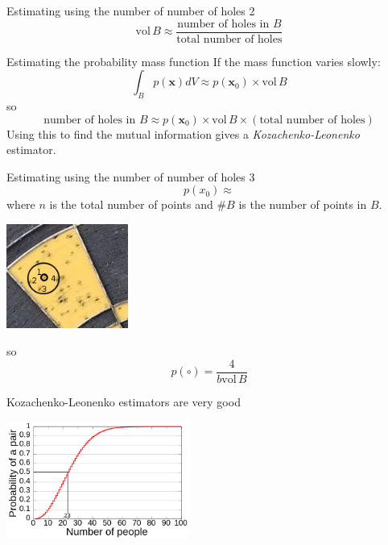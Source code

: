 \documentclass{beamer}
\begin{document}
\begin{frame}{Estimating using the number of number of holes 2}
\color{dark}
$$\mbox{vol}\,B\approx \frac{\mbox{number of holes in }B}{\mbox{total number of holes}}$$
\end{frame}

\begin{frame}{Estimating the probability mass function}
\color{black}
If the mass function varies slowly:
\color{dark}
$$\int_B p(\mathbf{x})dV\approx p(\mathbf{x}_0) \times \mbox{vol}\,B$$
\color{black}
so
\color{dark}
$$\mbox{number of holes in }B \approx p(\mathbf{x}_0) \times \mbox{vol}\,B \times (\mbox{total number of holes})$$
\color{black}
Using this to find the mutual information gives a \textsl{Kozachenko-Leonenko} estimator.
\end{frame}


\begin{frame}{Estimating using the number of number of holes 3}
\color{dark}
$$p(x_0)\approx%
$$
\color{black}
where $n$ is the total number of points and $\#B$ is the number of points in $B$.
\color{reddish}
\begin{center}
\includegraphics[width=4cm]{dart_board_zoom_ball.png}
\end{center}
\color{black}
so 
$$p(\circ)=\frac{4}{b\mbox{vol}\,B}$$
\end{frame}



\begin{frame}{Kozachenko-Leonenko estimators are very good}
\color{reddish}
\begin{center}
\includegraphics[width=6cm]{Birthday_Paradox.png}
\end{center}
\color{black}
\vfill
\color{gray}
\color{black}
\end{frame}
\end{document}

